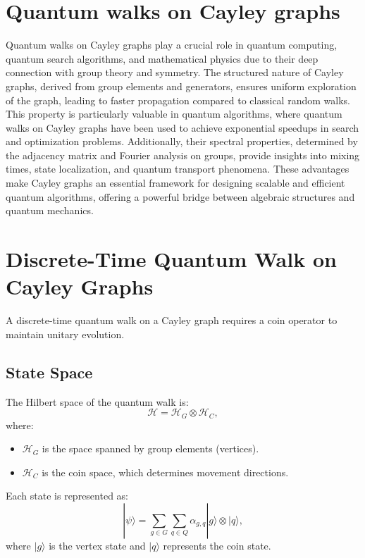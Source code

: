 \documentclass[11pt]{article}
\theoremstyle{definition}
\begin{document}
\section*{Quantum walks on Cayley graphs}
Quantum walks on Cayley graphs play a crucial role in quantum computing, quantum search algorithms, and mathematical physics due to their deep connection with group theory and symmetry. The structured nature of Cayley graphs, derived from group elements and generators, ensures uniform exploration of the graph, leading to faster propagation compared to classical random walks. This property is particularly valuable in quantum algorithms, where quantum walks on Cayley graphs have been used to achieve exponential speedups in search and optimization problems. Additionally, their spectral properties, determined by the adjacency matrix and Fourier analysis on groups, provide insights into mixing times, state localization, and quantum transport phenomena. These advantages make Cayley graphs an essential framework for designing scalable and efficient quantum algorithms, offering a powerful bridge between algebraic structures and quantum mechanics.



\section*{Discrete-Time Quantum Walk on Cayley Graphs}

A discrete-time quantum walk on a Cayley graph requires a coin operator to maintain unitary evolution.

\subsection*{State Space}
The Hilbert space of the quantum walk is:
\[
\mathcal{H} = \mathcal{H}_G \otimes \mathcal{H}_C,
\]
where:
\begin{itemize}
    \item \( \mathcal{H}_G \) is the space spanned by group elements (vertices).
    \item \( \mathcal{H}_C \) is the coin space, which determines movement directions.
\end{itemize}

Each state is represented as:
\[
|\psi\rangle = \sum_{g \in G} \sum_{q \in Q} \alpha_{g,q} |g\rangle \otimes |q\rangle,
\]
where \( |g\rangle \) is the vertex state and \( |q\rangle \) represents the coin state.
\end{document}
